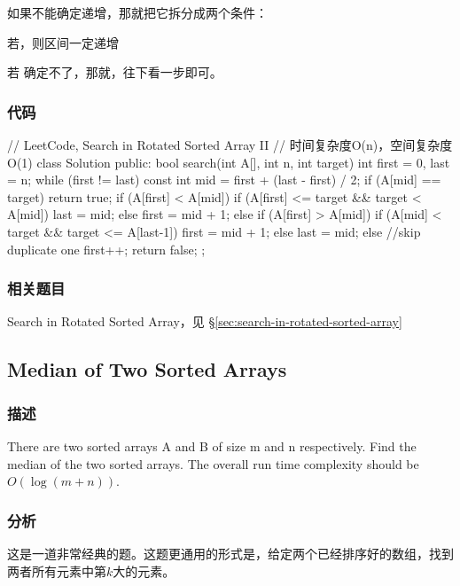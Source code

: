 如果不能确定递增，那就把它拆分成两个条件：
\begindot
\item 若，则区间\fn{[l,m]}一定递增
\item 若 确定不了，那就，往下看一步即可。
\myenddot

\subsubsection{代码}
\begin{Code}
// LeetCode, Search in Rotated Sorted Array II
// 时间复杂度O(n)，空间复杂度O(1)
class Solution {
public:
    bool search(int A[], int n, int target) {
        int first = 0, last = n;
        while (first != last) {
            const int mid = first  + (last - first) / 2;
            if (A[mid] == target)
                return true;
            if (A[first] < A[mid]) {
                if (A[first] <= target && target < A[mid])
                    last = mid;
                else
                    first = mid + 1;
            } else if (A[first] > A[mid]) {
                if (A[mid] < target && target <= A[last-1])
                    first = mid + 1;
                else
                    last = mid;
            } else
                //skip duplicate one
                first++;
        }
        return false;
    }
};
\end{Code}


\subsubsection{相关题目}

\begindot
\item Search in Rotated Sorted Array，见 \S \ref{sec:search-in-rotated-sorted-array}
\myenddot


\subsection{Median of Two Sorted Arrays}
\label{sec:median-of-two-sorted-arrays}


\subsubsection{描述}
There are two sorted arrays A and B of size m and n respectively. Find the median of the two sorted arrays. The overall run time complexity should be $O(\log (m+n))$.


\subsubsection{分析}
这是一道非常经典的题。这题更通用的形式是，给定两个已经排序好的数组，找到两者所有元素中第$k$大的元素。

